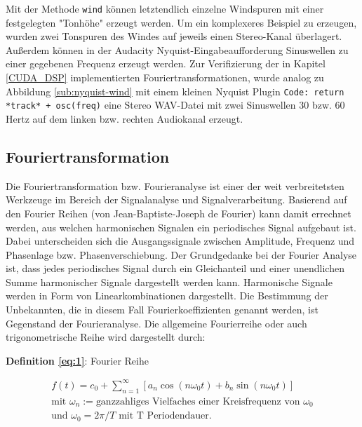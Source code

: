 Mit der Methode \texttt{wind} können letztendlich einzelne Windspuren mit einer festgelegten "Tonhöhe" erzeugt werden. Um ein komplexeres Beispiel zu erzeugen, wurden zwei Tonspuren des Windes auf jeweils einen Stereo-Kanal überlagert.
Außerdem können in der Audacity Nyquist-Eingabeaufforderung Sinuswellen zu einer gegebenen Frequenz erzeugt werden. Zur Verifizierung der in Kapitel \ref{CUDA_DSP} implementierten Fouriertransformationen, wurde analog zu Abbildung  \ref{sub:nyquist-wind} mit einem kleinen Nyquist Plugin \texttt{Code: return *track* + osc(freq)} eine Stereo WAV-Datei mit zwei Sinuswellen 30 bzw. 60 Hertz auf dem linken bzw. rechten Audiokanal erzeugt.
\newpage
\subsection{Fouriertransformation}

Die Fouriertransformation bzw. Fourieranalyse ist einer der weit verbreitetsten Werkzeuge im Bereich der Signalanalyse und Signalverarbeitung. Basierend auf den Fourier Reihen (von Jean-Baptiste-Joseph de Fourier) kann damit errechnet werden, aus welchen harmonischen Signalen ein periodisches Signal aufgebaut ist. Dabei unterscheiden sich die Ausgangssignale zwischen Amplitude, Frequenz und Phasenlage bzw. Phasenverschiebung. Der Grundgedanke bei der Fourier Analyse ist, dass jedes periodisches Signal durch ein Gleichanteil und einer unendlichen Summe harmonischer Signale dargestellt werden kann. Harmonische Signale werden in Form von Linearkombinationen dargestellt. Die Bestimmung der Unbekannten, die in diesem Fall Fourierkoeffizienten genannt werden, ist Gegenstand der Fourieranalyse. Die allgemeine Fourierreihe oder auch trigonometrische Reihe wird dargestellt durch:


\begin{flushleft}
	\textbf{Definition \eqref{eq:1}}: Fourier Reihe
\end{flushleft}
\vspace{\baselineskip}
\begin{equation}
	\begin{gathered}
	f(t) = c_{0} + \sum_{n=1}^{\infty} \left [ a_{n} \cos(n\omega_{0}t) + b_{n} \sin(n\omega_{0}t) \right ] \\ \text{mit }  \omega_{n} := \text{ganzzahliges Vielfaches einer Kreisfrequenz von } \omega_{0} \\
		\text{und } \omega_{0} = 2 \pi / T \text{ mit T Periodendauer.}
	\end{gathered}\label{eq:1}
\end{equation}
